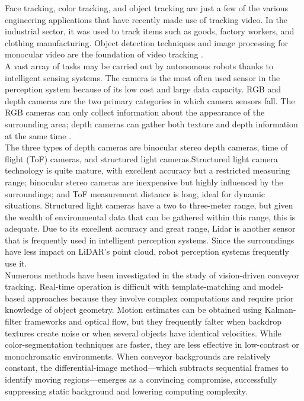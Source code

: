 \documentclass[12pt]{article}
\begin{document}
Face tracking, color tracking, and object tracking are just a few of the various engineering applications that have recently made use of tracking video.  In the industrial sector, it was used to track items such as goods, factory workers, and clothing manufacturing.  Object detection techniques and image processing for monocular video are the foundation of video tracking \cite{ref12}.\\

A vast array of tasks may be carried out by autonomous robots thanks to intelligent sensing systems. The camera is the most often used sensor in the perception system because of its low cost and large data capacity. RGB and depth cameras are the two primary categories in which camera sensors fall. The RGB cameras can only collect information about the appearance of the surrounding area; depth cameras can gather both texture and depth information at the same time \cite{ref12}.\\

The three types of depth cameras are binocular stereo depth cameras, time of flight (ToF) cameras, and structured light cameras.Structured light camera technology is quite mature, with excellent accuracy but a restricted measuring range; binocular stereo cameras are inexpensive but highly influenced by the surroundings; and ToF measurement distance is long, ideal for dynamic situations.  Structured light cameras have a two to three-meter range, but given the wealth of environmental data that can be gathered within this range, this is adequate. Due to its excellent accuracy and great range, Lidar is another sensor that is frequently used in intelligent perception systems.  Since the surroundings have less impact on LiDAR's point cloud, robot perception systems frequently use it\cite{ref12}.\\

Numerous methods have been investigated in the study of vision-driven conveyor tracking.  Real-time operation is difficult with template-matching and model-based approaches because they involve complex computations and require prior knowledge of object geometry.  Motion estimates can be obtained using Kalman-filter frameworks and optical flow, but they frequently falter when backdrop textures create noise or when several objects have identical velocities.  While color-segmentation techniques are faster, they are less effective in low-contrast or monochromatic environments.  When conveyor backgrounds are relatively constant, the differential-image method—which subtracts sequential frames to identify moving regions—emerges as a convincing compromise, successfully suppressing static background and lowering computing complexity\cite{ref12}.\\
\end{document}
